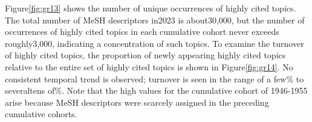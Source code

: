 Figure\ref{fig:gr13} shows the number of unique occurrences of highly cited topics. The total number of MeSH descriptors in2023 is about30,000, but the number of occurrences of highly cited topics in each cumulative cohort never exceeds roughly3,000, indicating a concentration of such topics. To examine the turnover of highly cited topics, the proportion of newly appearing highly cited topics relative to the entire set of highly cited topics is shown in Figure\ref{fig:gr14}. No consistent temporal trend is observed; turnover is seen in the range of a few\% to severaltens of\%. Note that the high values for the cumulative cohort of 1946-1955 arise because MeSH descriptors were scarcely assigned in the preceding cumulative cohorts.
